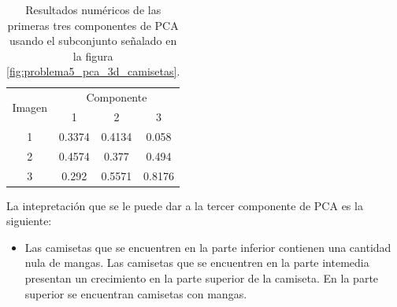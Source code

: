 \begin{table}[H]
    \centering
    \begin{tabular}{cccc} \hline
        \multirow{2}{*}{Imagen} & \multicolumn{3}{c}{Componente}                   \\
                                & 1                              & 2      & 3      \\ \hline
        1                       & 0.3374                         & 0.4134 & 0.058  \\
        2                       & 0.4574                         & 0.377  & 0.494  \\
        3                       & 0.292                          & 0.5571 & 0.8176 \\ \hline
    \end{tabular}
    \caption{Resultados numéricos de las primeras tres componentes de PCA usando el subconjunto señalado en la figura \ref{fig:problema5_pca_3d_camisetas}.}
    \label{table:pca_3d}
\end{table}

La intepretación que se le puede dar a la tercer componente de PCA es la siguiente:

\begin{itemize}
    \item Las camisetas que se encuentren en la parte inferior contienen una cantidad nula de mangas. Las camisetas que se encuentren en la parte intemedia presentan un crecimiento en la parte superior de la camiseta. En la parte superior se encuentran camisetas con mangas.
\end{itemize}